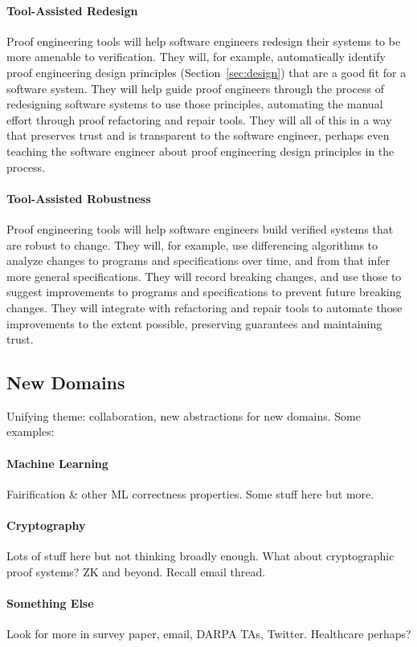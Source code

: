 \paragraph{Tool-Assisted Redesign} 
Proof engineering tools will help software engineers redesign their systems to be more amenable to verification.
They will, for example, automatically identify proof engineering design principles (Section~\ref{sec:design})
that are a good fit for a software system.
They will help guide proof engineers through the process of redesigning software systems to use those principles,
automating the manual effort through proof refactoring and repair tools.
They will all of this in a way that preserves trust and is transparent to the software engineer,
perhaps even teaching the software engineer about proof engineering design principles in the process.

\paragraph{Tool-Assisted Robustness}
Proof engineering tools will help software engineers build verified systems that are robust to change.
They will, for example, use differencing algorithms to analyze changes to programs and specifications over time,
and from that infer more general specifications.
They will record breaking changes, and use those to suggest improvements to programs and specifications to prevent future breaking changes.
They will integrate with refactoring and repair tools to automate those improvements to the extent possible,
preserving guarantees and maintaining trust.

\subsection*{New Domains}

Unifying theme: collaboration, new abstractions for new domains. Some examples:

\paragraph{Machine Learning} Fairification \& other ML correctness properties. Some stuff here but more.

\paragraph{Cryptography} Lots of stuff here but not thinking broadly enough. What about cryptographic proof systems? ZK and beyond. Recall email thread.

\paragraph{Something Else} Look for more in survey paper, email, DARPA TAs, Twitter. Healthcare perhaps? %
